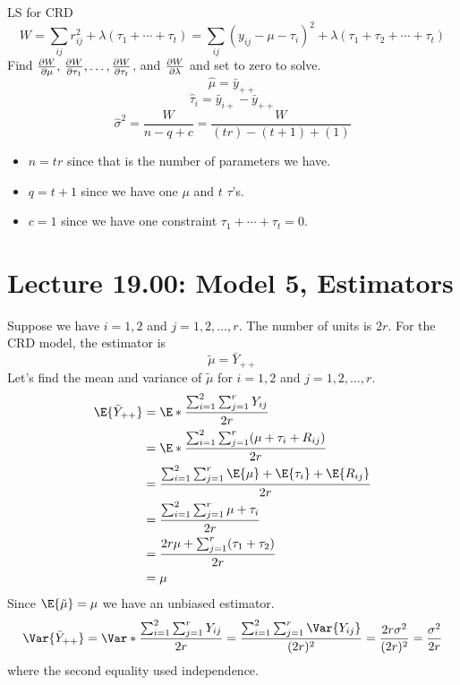 \begin{Example}{LS for CRD}{}
    \[ W=\sum_{ij}r_{ij}^2+\lambda(\tau_1+\cdots+\tau_t)=
        \sum_{ij}(y_{ij}-\mu-\tau_i)^2+\lambda(\tau_1+\tau_2+\cdots+\tau_t)   \]
    Find $ \pdv{W}{\mu},\, \pdv{W}{\tau_1},\ldots,\pdv{W}{\tau_t} $, and $ \pdv{W}{\lambda} $
    and set to zero to solve.
    \[ \hat{\mu}=\bar{y}_{++} \]
    \[ \hat{\tau}_i=\bar{y}_{i+}-\bar{y}_{++} \]
    \[ \hat{\sigma}^2=\frac{W}{n-q+c}=\frac{W}{(tr)-(t+1)+(1)} \]
    \begin{itemize}
        \item $ n=tr $ since that is the number of parameters we have.
        \item $ q=t+1 $ since we have one $ \mu $ and $ t $ $ \tau $'s.
        \item $ c=1 $ since we have one constraint $ \tau_1+\cdots+\tau_t=0 $.
    \end{itemize}
\end{Example}
\section{Lecture 19.00: Model 5, Estimators}
Suppose we have $ i=1,2 $ and $ j=1,2,\ldots,r $.
The number of units is $ 2r $. For the CRD model, the estimator is
\[ \tilde{\mu}=\bar{Y}_{++} \]
Let's find the mean and variance of $ \tilde{\mu} $ for $ i=1,2 $ and
$ j=1,2,\ldots,r $.
\begin{align*}
    \E{\bar{Y}_{++}}
     & =\E*{\frac{\sum_{i=1}^{2} \sum_{j=1}^{r} Y_{ij}}{2r} }                  \\
     & =\E*{\frac{\sum_{i=1}^{2} \sum_{j=1}^{r} (\mu+\tau_i+R_{ij})}{2r} }     \\
     & =\frac{\sum_{i=1}^{2} \sum_{j=1}^{r} \E{\mu}+\E{\tau_i}+\E{R_{ij}}}{2r} \\
     & =\frac{\sum_{i=1}^{2} \sum_{j=1}^{r} \mu+\tau_i}{2r}                    \\
     & =\frac{2r\mu+\sum_{j=1}^{r} (\tau_1+\tau_2)}{2r}                        \\
     & =\mu
\end{align*}
Since $ \E{\tilde{\mu}}=\mu $ we have an unbiased estimator.
\[ \Var{\bar{Y}_{++}}
    =\Var*{\frac{\sum_{i=1}^{2} \sum_{j=1}^{r} Y_{ij}}{2r} }
    =\frac{\sum_{i=1}^{2} \sum_{j=1}^{r} \Var{Y_{ij}}}{(2r)^2}
    =\frac{2r\sigma^2}{(2r)^2}
    =\frac{\sigma^2}{2r}  \]
where the second equality used independence.

